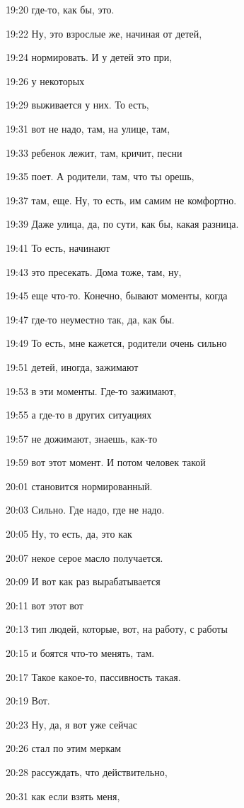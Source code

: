 19:20
где-то, как бы, это.

19:22
Ну, это взрослые же, начиная от детей,

19:24
нормировать. И у детей это при,

19:26
у некоторых

19:29
выживается у них. То есть,

19:31
вот не надо, там, на улице, там,

19:33
ребенок лежит, там, кричит, песни

19:35
поет. А родители, там, что ты орешь,

19:37
там, еще. Ну, то есть, им самим не комфортно.

19:39
Даже улица, да, по сути, как бы, какая разница.

19:41
То есть, начинают

19:43
это пресекать. Дома тоже, там, ну,

19:45
еще что-то. Конечно, бывают моменты, когда

19:47
где-то неуместно так, да, как бы.

19:49
То есть, мне кажется, родители очень сильно

19:51
детей, иногда, зажимают

19:53
в эти моменты. Где-то зажимают,

19:55
а где-то в других ситуациях

19:57
не дожимают, знаешь, как-то

19:59
вот этот момент. И потом человек такой

20:01
становится нормированный.

20:03
Сильно. Где надо, где не надо.

20:05
Ну, то есть, да, это как

20:07
некое серое масло получается.

20:09
И вот как раз вырабатывается

20:11
вот этот вот

20:13
тип людей, которые, вот, на работу, с работы

20:15
и боятся что-то менять, там.

20:17
Такое какое-то, пассивность такая.

20:19
Вот.

20:23
Ну, да, я вот уже сейчас

20:26
стал по этим меркам

20:28
рассуждать, что действительно,

20:31
как если взять меня,

